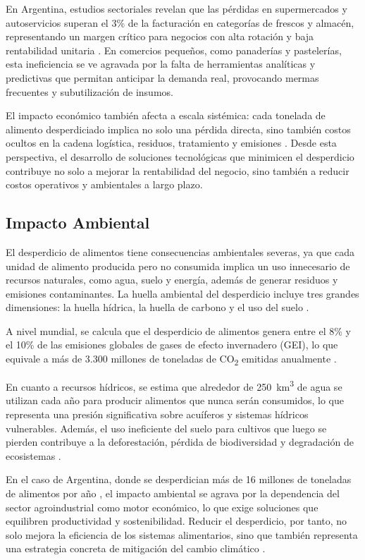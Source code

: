 En Argentina, estudios sectoriales revelan que las pérdidas en supermercados y autoservicios superan el 3\% de la facturación en categorías de frescos y almacén, representando un margen crítico para negocios con alta rotación y baja rentabilidad unitaria \parencite{weteam2021}. En comercios pequeños, como panaderías y pastelerías, esta ineficiencia se ve agravada por la falta de herramientas analíticas y predictivas que permitan anticipar la demanda real, provocando mermas frecuentes y subutilización de insumos.

El impacto económico también afecta a escala sistémica: cada tonelada de alimento desperdiciado implica no solo una pérdida directa, sino también costos ocultos en la cadena logística, residuos, tratamiento y emisiones \parencite{refed2016}. Desde esta perspectiva, el desarrollo de soluciones tecnológicas que minimicen el desperdicio contribuye no solo a mejorar la rentabilidad del negocio, sino también a reducir costos operativos y ambientales a largo plazo.

\subsection{Impacto Ambiental}

El desperdicio de alimentos tiene consecuencias ambientales severas, ya que cada unidad de alimento producida pero no consumida implica un uso innecesario de recursos naturales, como agua, suelo y energía, además de generar residuos y emisiones contaminantes. La huella ambiental del desperdicio incluye tres grandes dimensiones: la huella hídrica, la huella de carbono y el uso del suelo \parencite{fao2013}.

A nivel mundial, se calcula que el desperdicio de alimentos genera entre el 8\% y el 10\% de las emisiones globales de gases de efecto invernadero (GEI), lo que equivale a más de 3.300 millones de toneladas de CO\textsubscript{2} emitidas anualmente \parencite{unep2021}. 

En cuanto a recursos hídricos, se estima que alrededor de 250~km\textsuperscript{3} de agua se utilizan cada año para producir alimentos que nunca serán consumidos, lo que representa una presión significativa sobre acuíferos y sistemas hídricos vulnerables. Además, el uso ineficiente del suelo para cultivos que luego se pierden contribuye a la deforestación, pérdida de biodiversidad y degradación de ecosistemas \parencite{kummu2012}.

En el caso de Argentina, donde se desperdician más de 16 millones de toneladas de alimentos por año \parencite{tiscornia2022}, el impacto ambiental se agrava por la dependencia del sector agroindustrial como motor económico, lo que exige soluciones que equilibren productividad y sostenibilidad. Reducir el desperdicio, por tanto, no solo mejora la eficiencia de los sistemas alimentarios, sino que también representa una estrategia concreta de mitigación del cambio climático \parencite{unep2021}.

